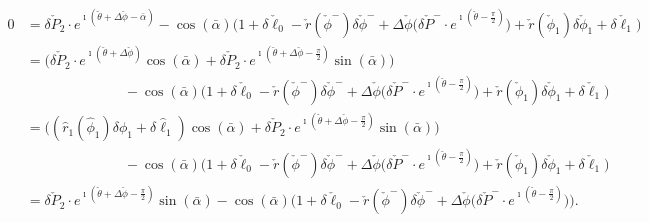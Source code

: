 \documentclass[reqno]{amsart}
\theoremstyle{definition} \newtheorem{definition}{Definition}[section]
\theoremstyle{definition} \newtheorem{remark}[definition]{Remark}
\theoremstyle{plain} \newtheorem{lemma}[definition]{Lemma}
\theoremstyle{plain} \newtheorem{proposition}[definition]{Proposition}
\theoremstyle{plain} \newtheorem{theorem}[definition]{Theorem}
\theoremstyle{plain} \newtheorem{corollary}[definition]{Corollary}
\theoremstyle{definition} \newtheorem{example}[definition]{Example}
\theoremstyle{plain} \newtheorem{claim}[clai]{Claim}
\theoremstyle{definition} \newtheorem{assumption}[definition]{Assumption}
\theoremstyle{definition} \newtheorem{observation}[definition]{Observation}
\newcommand{\1}{\mathbbm 1}
\renewcommand{\i}{\imath}
\numberwithin{equation}{section} %
\theoremstyle{plain} \newtheorem*{theorem*}{Theorem}
\theoremstyle{plain} \newtheorem{mthm}[maintheorem]{Main Theorem}
\theoremstyle{plain} \newtheorem*{mthm*}{Main Theorem}
\theoremstyle{plain} \newtheorem*{conjecture*}{Conjecture}
\theoremstyle{plain} \newtheorem{conjecture}[definition]{Conjecture}
\theoremstyle{plain} \newtheorem*{problem*}{Problem}
\begin{document}
\begin{equation*}
\begin{split}
0 &= \delta \check P_2 \cdot e^{\i (\check \theta + \Delta \check \phi - \bar \alpha)} - \cos(\bar \alpha) \bigg( 1 + \delta \check \ell_0 - \check r(\check \phi^-) \delta \check \phi^- + \Delta \check \phi \big( \delta \check P^- \cdot e^{\i (\check \theta - \frac{\pi}{2})} \big) + \check r(\check \phi_1) \delta \check \phi_1 + \delta \check \ell_1 \bigg) \\
&= \big( \delta \check P_2 \cdot e^{\i (\check \theta + \Delta \check \phi)} \cos(\bar \alpha) + \delta \check P_2 \cdot e^{\i (\check \theta + \Delta \check \phi - \frac{\pi}{2})} \sin(\bar \alpha) \big) \\
& \quad \qquad \qquad \qquad - \cos(\bar \alpha) \bigg( 1 + \delta \check \ell_0 - \check r(\check \phi^-) \delta \check \phi^- + \Delta \check \phi \big( \delta \check P^- \cdot e^{\i (\check \theta - \frac{\pi}{2})} \big) + \check r(\check \phi_1) \delta \check \phi_1 + \delta \check \ell_1 \bigg) \\
&= \big( (\hat r_1(\hat \phi_1) \delta \phi_1 + \delta \hat \ell_1) \cos(\bar \alpha) + \delta \check P_2 \cdot e^{\i (\check \theta + \Delta \check \phi - \frac{\pi}{2})} \sin(\bar \alpha) \big) \\
&\quad \qquad \qquad \qquad - \cos(\bar \alpha) \bigg( 1 + \delta \check \ell_0 - \check r(\check \phi^-) \delta \check \phi^- + \Delta \check \phi \big( \delta \check P^- \cdot e^{\i (\check \theta - \frac{\pi}{2})} \big) + \check r(\check \phi_1) \delta \check \phi_1 + \delta \check \ell_1 \bigg) \\
&= \delta \check P_2 \cdot e^{\i (\check \theta + \Delta \check \phi - \frac{\pi}{2})} \sin(\bar \alpha) - \cos(\bar \alpha) \bigg( 1 + \delta \check \ell_0 - \check r(\check \phi^-) \delta \check \phi^- + \Delta \check \phi \big( \delta \check P^- \cdot e^{\i (\check \theta - \frac{\pi}{2})} \big) \bigg).
\end{split}
\end{equation*}
%
\end{document}

